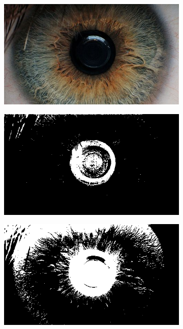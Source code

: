 \documentclass{article}
\begin{document}
\begin{figure}[H]
\centering
\begin{subfigure}{.3\textwidth}
  \centering
  \includegraphics[width=0.97\linewidth]{_Figures/sample_1.jpg}
  \caption{}
  \label{fig:tresh_raw_1}
\end{subfigure}%
\begin{subfigure}{.3\textwidth}
  \centering
  \includegraphics[width=0.97\linewidth]{_Figures/sample_1_good_treshold.png}
  \caption{}
  \label{fig:tresh_good_1}
\end{subfigure}%
\begin{subfigure}{.3\textwidth}
  \centering
  \includegraphics[width=0.97\linewidth]{_Figures/sample_1_bad_treshold.png}
    \caption{}
  \label{fig:tresh_bad_1}
\end{subfigure}


\end{figure}
\end{document}
